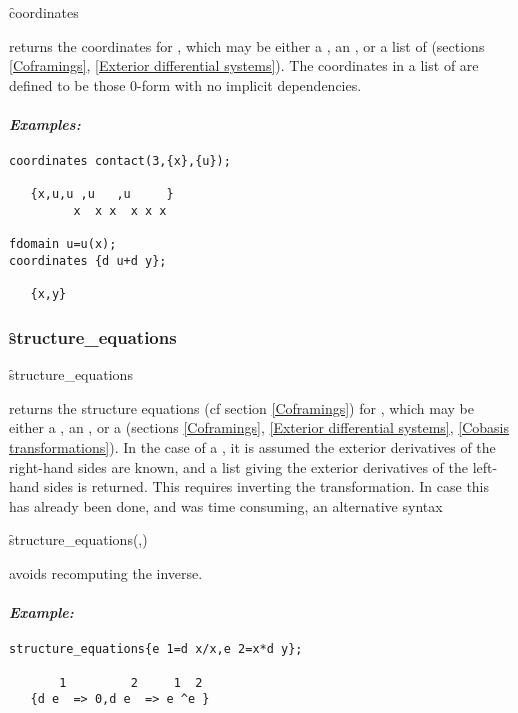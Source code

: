 \hypertarget{operator:EDS_COORDINATES}{}
\begin{syntax}
	\f{coordinates} 
\end{syntax}
returns the coordinates for , which may be either a
, an , or a list of  (sections
\ref{Coframings}, \ref{Exterior differential systems}). The coordinates in a
list of  are defined to be those 0-form  with no
implicit dependencies.

\paragraph{\textit{Examples:}}
\begin{verbatim}
coordinates contact(3,{x},{u});

   {x,u,u ,u   ,u     }
         x  x x  x x x

fdomain u=u(x);
coordinates {d u+d y};

   {x,y}
\end{verbatim}

\subsubsection{\f{structure\_equations}}
\label{structure_equations}

\hypertarget{operator:STRUCTURE_EQUATIONS}{}
\begin{syntax}
	\f{structure\_equations} 
\end{syntax}
returns the structure equations (cf section \ref{Coframings}) for
, which may be either a , an , or a
 (sections \ref{Coframings}, \ref{Exterior differential
systems}, \ref{Cobasis transformations}). In the case of a
, it is assumed the exterior derivatives of the right-hand
sides are known, and a list giving the exterior derivatives of the
left-hand sides is returned. This requires inverting the transformation. In
case this has already been done, and was time consuming, an alternative
syntax
\begin{syntax}
	\f{structure\_equations}(,)
\end{syntax}
avoids recomputing the inverse.

\paragraph{\textit{Example:}}
\begin{verbatim}
structure_equations{e 1=d x/x,e 2=x*d y};

       1         2     1  2
   {d e  => 0,d e  => e ^e }
\end{verbatim}

